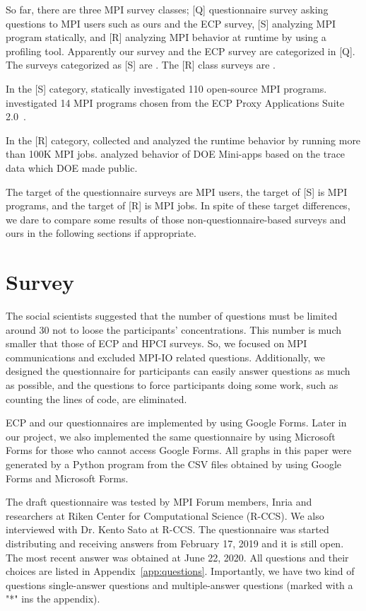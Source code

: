 \documentclass[conference,10pt,letterpaper]{IEEEtran}
\begin{document}
So far, there are three MPI survey classes; [Q] questionnaire
survey asking questions to MPI users such as ours and the ECP survey,
[S] analyzing MPI program statically, and [R] analyzing MPI behavior
at runtime by using a profiling tool. Apparently our survey and the
ECP survey are categorized in [Q]. The surveys categorized as [S] are
\cite{10.1145/3295500.3356176, Sultana2018UnderstandingTU}. The [R]
class surveys are
\cite{10.1109/SC.2018.00033,10.1007/978-3-319-58667-0_12}. 

In the [S] category, \cite{10.1145/3295500.3356176} statically
investigated 110 open-source MPI
programs. \cite{Sultana2018UnderstandingTU} investigated 14 MPI
programs chosen from the ECP Proxy Applications Suite
2.0~\cite{osti_1482870}. 

In the [R] category, \cite{10.1109/SC.2018.00033} collected and
analyzed the runtime behavior by running more than 100K MPI
jobs. \cite{10.1007/978-3-319-58667-0_12} analyzed behavior of DOE
Mini-apps based on the trace data which DOE made public.

The target of the questionnaire surveys are MPI users, the target of
[S] is MPI programs, and the target of [R] is MPI jobs. In spite of
these target differences, we dare to compare some results of those
non-questionnaire-based surveys and ours in the 
following sections if appropriate.

\section{Survey}

%
%
The social scientists suggested that the number of questions must be
limited around 30 not to loose the participants' concentrations.  
This number is much smaller that those of ECP and HPCI surveys. So, we
focused on MPI communications and excluded MPI-IO related
questions. Additionally, we designed the questionnaire for
participants can easily answer questions as much as possible, and
the questions to force participants doing some work, such as
counting the lines of code, are eliminated. 

ECP and our questionnaires are implemented by using Google Forms. Later
in our project, we also implemented the same questionnaire by using
Microsoft Forms for those who cannot access Google Forms. All graphs
in this paper were generated by a Python program from the CSV files
obtained by using Google Forms and Microsoft Forms.

The draft questionnaire was tested by MPI Forum members, Inria and
researchers at Riken Center for Computational Science (R-CCS). We also
interviewed with Dr. Kento Sato at R-CCS.
The questionnaire was started distributing and receiving answers from
February 17, 2019 and it is still open. The most recent answer was
obtained at June 22, 2020. All questions and their choices are
listed in
Appendix~\ref{app:questions}.  Importantly, we have two kind of
questions single-answer questions and multiple-answer questions
(marked with a "*" ins the appendix).
\end{document}
